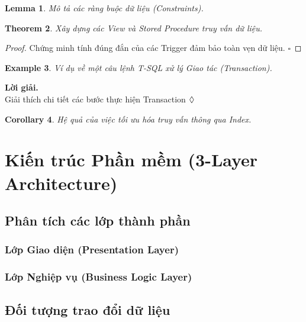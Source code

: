 \documentclass[12pt,a4paper,oneside]{book}
\theoremstyle{plain}
\newtheorem{thm}{Theorem}[chapter]
\newtheorem{lem}[thm]{Lemma}
\newtheorem{cor}[thm]{Corollary}
\newtheorem{ex}[thm]{Example}
\numberwithin{equation}{chapter} \DeclareMathOperator{\Var}{Var}
\newcommand*{\QEDA}{\hfill\ensuremath{\large{\lozenge}}}
\newcommand*{\QEDAa}{\hfill\ensuremath{\square}}
\begin{document}
\vspace{1cm}

\begin{lem}\label{lem1}
	Mô tả các ràng buộc dữ liệu (Constraints).
\end{lem}

\vspace{1cm}

\begin{thm}\label{thm1}
	Xây dựng các View và Stored Procedure truy vấn dữ liệu.
\end{thm}

\noindent\begin{proof}
	Chứng minh tính đúng đắn của các Trigger đảm bảo toàn vẹn dữ liệu.
	\QEDAa
\end{proof}

\vspace{1cm}

\begin{ex}\label{ex1}
	Ví dụ về một câu lệnh T-SQL xử lý Giao tác (Transaction).
\end{ex}
\noindent\textbf{Lời giải.}\\
Giải thích chi tiết các bước thực hiện Transaction \QEDA

\vspace{1cm}

\begin{cor}
	Hệ quả của việc tối ưu hóa truy vấn thông qua Index.
\end{cor}


\chapter{Kiến trúc Phần mềm (3-Layer Architecture)}
\section{Phân tích các lớp thành phần}\label{Sec3.1}
\subsection{Lớp Giao diện (Presentation Layer)}\label{sub3.1.1}
\subsection{Lớp Nghiệp vụ (Business Logic Layer)}\label{sub3.1.2}

\section{Đối tượng trao đổi dữ liệu}\label{Sec3.2}
\end{document}
